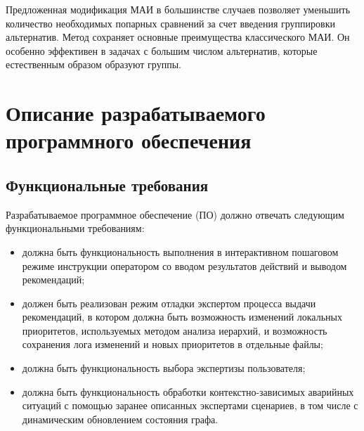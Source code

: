 Предложенная модификация МАИ в большинстве случаев позволяет уменьшить количество необходимых попарных сравнений за счет введения группировки альтернатив.
Метод сохраняет основные преимущества классического МАИ. 
Он особенно эффективен в задачах с большим числом альтернатив, которые естественным образом образуют группы.

\section{Описание разрабатываемого программного обеспечения}
\subsection{Функциональные требования}

Разрабатываемое программное обеспечение (ПО) должно отвечать следующим функциональными требованиям:
\begin{itemize}
    \item должна быть функциональность выполнения в интерактивном пошаговом режиме инструкции оператором со вводом результатов действий и выводом рекомендаций;
    \item должен быть реализован режим отладки экспертом процесса выдачи рекомендаций, в котором должна быть возможность изменений локальных приоритетов, используемых методом анализа иерархий, и возможность сохранения лога изменений и новых приоритетов в отдельные файлы;%
    \item должна быть функциональность выбора экспертизы пользователя;
    \item должна быть функциональность обработки контекстно-зависимых аварийных ситуаций с помощью заранее описанных экспертами сценариев, в том числе с динамическим обновлением состояния графа.
\end{itemize}

